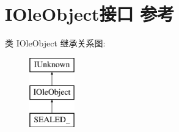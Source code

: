 \hypertarget{interface_i_ole_object}{}\section{I\+Ole\+Object接口 参考}
\label{interface_i_ole_object}
类 I\+Ole\+Object 继承关系图\+:\begin{figure}[H]
\begin{center}
\leavevmode
\includegraphics[height=3.000000cm]{interface_i_ole_object}
\end{center}
\end{figure}
